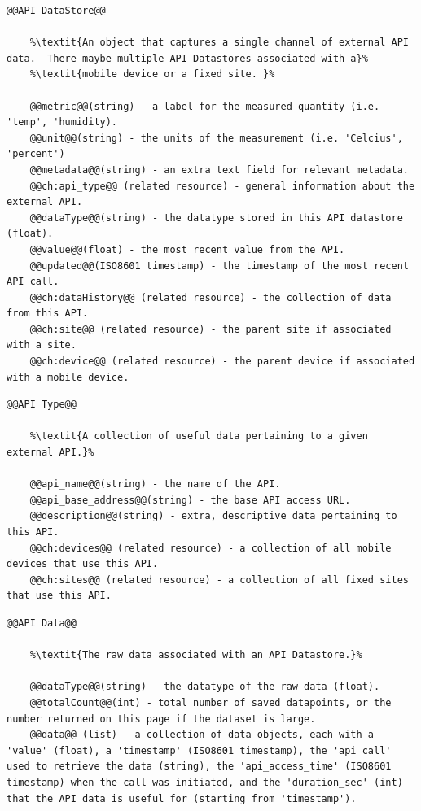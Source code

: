 \begin{lstlisting}[style=codedef]
@@API DataStore@@
	
	%\textit{An object that captures a single channel of external API data.  There maybe multiple API Datastores associated with a}%
	%\textit{mobile device or a fixed site. }%	

	@@metric@@(string) - a label for the measured quantity (i.e. 'temp', 'humidity).
	@@unit@@(string) - the units of the measurement (i.e. 'Celcius', 'percent')
	@@metadata@@(string) - an extra text field for relevant metadata.
	@@ch:api_type@@ (related resource) - general information about the external API.
	@@dataType@@(string) - the datatype stored in this API datastore (float).
	@@value@@(float) - the most recent value from the API.	
	@@updated@@(ISO8601 timestamp) - the timestamp of the most recent API call.
	@@ch:dataHistory@@ (related resource) - the collection of data from this API.
	@@ch:site@@ (related resource) - the parent site if associated with a site.
	@@ch:device@@ (related resource) - the parent device if associated with a mobile device.

\end{lstlisting}

\begin{lstlisting}[style=codedef]
@@API Type@@
	
	%\textit{A collection of useful data pertaining to a given external API.}%

	@@api_name@@(string) - the name of the API.
	@@api_base_address@@(string) - the base API access URL.
	@@description@@(string) - extra, descriptive data pertaining to this API.
	@@ch:devices@@ (related resource) - a collection of all mobile devices that use this API.
	@@ch:sites@@ (related resource) - a collection of all fixed sites that use this API.

\end{lstlisting}

\begin{lstlisting}[style=codedef]
@@API Data@@
	
	%\textit{The raw data associated with an API Datastore.}%

	@@dataType@@(string) - the datatype of the raw data (float).
	@@totalCount@@(int) - total number of saved datapoints, or the number returned on this page if the dataset is large.
	@@data@@ (list) - a collection of data objects, each with a 'value' (float), a 'timestamp' (ISO8601 timestamp), the 'api_call' used to retrieve the data (string), the 'api_access_time' (ISO8601 timestamp) when the call was initiated, and the 'duration_sec' (int) that the API data is useful for (starting from 'timestamp').

\end{lstlisting}

